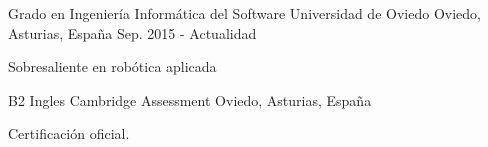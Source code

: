 

\begin{cventries}

  \cventry
  {Grado en Ingeniería Informática del Software} %
  {Universidad de Oviedo} %
  {Oviedo, Asturias, España} %
  {Sep. 2015 - Actualidad} %
  {
    \begin{cvitems} %
      \item {Sobresaliente en robótica aplicada}
    \end{cvitems}
  }


  \cventry
  {B2 Ingles} %
  {Cambridge Assessment} %
  {Oviedo, Asturias, España} %
  {} %
  {
    \begin{cvitems} %
      Certificación oficial.
    \end{cvitems}
  }

\end{cventries}
